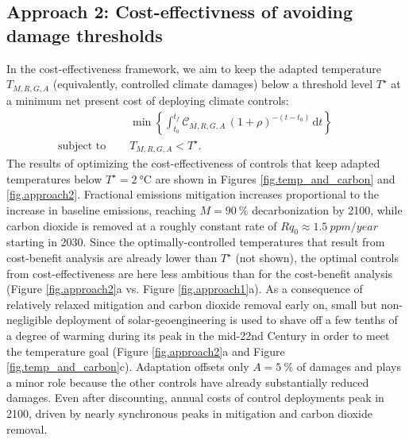 \documentclass{article}
\begin{document}
\subsection{Approach 2: Cost-effectivness of avoiding damage thresholds}\label{sec.cost-effectivness}

In the cost-effectiveness framework, we aim to keep the adapted temperature $T_{M,R,G,A}$ (equivalently, controlled climate damages) below a threshold level $T^{\star}$ at a minimum net present cost of deploying climate controls:
\begin{align}
    &\min \left\{ \int_{t_{0}}^{t_{f}} \mathcal{C}_{M, R, G, A}\, (1 + \rho)^{-(t-t_{0})} \, \text{d}t \right\}\label{eq.cost_effectiveness} \quad\quad \\
    \text{subject to }\quad
    &T_{M, R, G, A} < T^{\star}.
\end{align}
The results of optimizing the cost-effectiveness of controls that keep adapted temperatures below $T^{\star} = \SI{2}{\celsius}$ are shown in Figures \ref{fig.temp_and_carbon} and \ref{fig.approach2}. Fractional emissions mitigation increases proportional to the increase in baseline emissions, reaching $M=\SI{90}{\%}$ decarbonization by 2100, while carbon dioxide is removed at a roughly constant rate of $R q_{0} \approx \SI{1.5}{ppm/year}$ starting in 2030. Since the optimally-controlled temperatures that result from cost-benefit analysis are already lower than $T^{\star}$ (not shown), the optimal controls from cost-effectiveness are here less ambitious than for the cost-benefit analysis (Figure \ref{fig.approach2}a vs. Figure \ref{fig.approach1}a). As a consequence of relatively relaxed mitigation and carbon dioxide removal early on, small but non-negligible deployment of solar-geoengineering is used to shave off a few tenths of a degree of warming during its peak in the mid-22nd Century in order to meet the temperature goal (Figure \ref{fig.approach2}a and Figure \ref{fig.temp_and_carbon}c). Adaptation offsets only $A = \SI{5}{\%}$ of damages and plays a minor role because the other controls have already substantially reduced damages. Even after discounting, annual costs of control deployments peak in 2100, driven by nearly synchronous peaks in mitigation and carbon dioxide removal.
\end{document}
